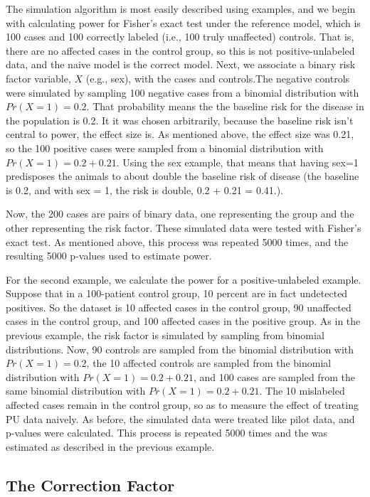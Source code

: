 \documentclass[
]{article}
\begin{document}
The simulation algorithm is most easily described using examples, and we
begin with calculating power for Fisher's exact test under the reference
model, which is 100 cases and 100 correctly labeled (i.e., 100 truly
unaffected) controls. That is, there are no affected cases in the
control group, so this is not positive-unlabeled data, and the naive
model is the correct model. Next, we associate a binary risk factor
variable, \(X\) (e.g., sex), with the cases and controls.The negative
controls were simulated by sampling 100 negative cases from a binomial
distribution with \(Pr(X=1) = 0.2\). That probability means the the
baseline risk for the disease in the population is 0.2. It it was chosen
arbitrarily, because the baseline risk isn't central to power, the
effect size is. As mentioned above, the effect size was 0.21, so the 100
positive cases were sampled from a binomial distribution with
\(Pr(X=1) = 0.2 + 0.21\). Using the sex example, that means that having
sex=1 predisposes the animals to about double the baseline risk of
disease (the baseline is 0.2, and with sex = 1, the risk is double, 0.2
+ 0.21 = 0.41.).

Now, the 200 cases are pairs of binary data, one representing the group
and the other representing the risk factor. These simulated data were
tested with Fisher's exact test. As mentioned above, this process was
repeated 5000 times, and the resulting 5000 p-values used to estimate
power.

For the second example, we calculate the power for a positive-unlabeled
example. Suppose that in a 100-patient control group, 10 percent are in
fact undetected positives. So the dataset is 10 affected cases in the
control group, 90 unaffected cases in the control group, and 100
affected cases in the positive group. As in the previous example, the
risk factor is simulated by sampling from binomial distributions. Now,
90 controls are sampled from the binomial distribution with
\(Pr(X=1) = 0.2\), the 10 affected controls are sampled from the
binomial distribution with \(Pr(X=1) = 0.2+ 0.21\), and 100 cases are
sampled from the same binomial distribution with
\(Pr(X=1) = 0.2 + 0.21\). The 10 mislabeled affected cases remain in the
control group, so as to measure the effect of treating PU data naively.
As before, the simulated data were treated like pilot data, and p-values
were calculated. This process is repeated 5000 times and the was
estimated as described in the previous example.

\hypertarget{the-correction-factor}{%
\subsection{The Correction Factor}\label{the-correction-factor}}
\end{document}
